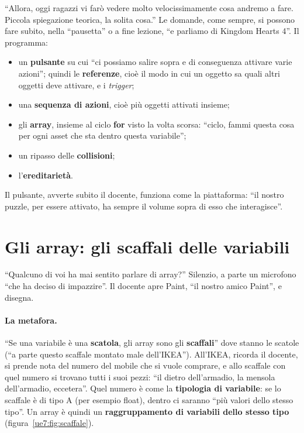 ``Allora, oggi ragazzi vi farò vedere molto velocissimamente cosa andremo a fare.
Piccola spiegazione teorica, la solita cosa.'' Le domande, come sempre, si possono fare
subito, nella ``pausetta'' o a fine lezione, ``e parliamo di Kingdom Hearts 4''. Il
programma:
\begin{itemize}
  \item un \textbf{pulsante} su cui ``ci possiamo salire sopra e di conseguenza
        attivare varie azioni''; quindi le \textbf{referenze}, cioè il modo in cui un
        oggetto sa quali altri oggetti deve attivare, e i \emph{trigger};
  \item una \textbf{sequenza di azioni}, cioè più oggetti attivati insieme;
  \item gli \textbf{array}, insieme al ciclo \textbf{for} visto la volta scorsa:
        ``ciclo, fammi questa cosa per ogni asset che sta dentro questa variabile'';
  \item un ripasso delle \textbf{collisioni};
  \item l'\textbf{ereditarietà}.
\end{itemize}
Il pulsante, avverte subito il docente, funziona come la piattaforma: ``il nostro
puzzle, per essere attivato, ha sempre il volume sopra di esso che interagisce''.

\section{Gli array: gli scaffali delle variabili}
\label{ue7:sec:arrayteoria}

``Qualcuno di voi ha mai sentito parlare di array?'' Silenzio, a parte un microfono
``che ha deciso di impazzire''. Il docente apre Paint, ``il nostro amico Paint'', e
disegna.

\paragraph{La metafora.} ``Se una variabile è una \textbf{scatola}, gli array sono gli
\textbf{scaffali}'' dove stanno le scatole (``a parte questo scaffale montato male
dell'IKEA''). All'IKEA, ricorda il docente, si prende nota del numero del mobile che si
vuole comprare, e allo scaffale con quel numero si trovano tutti i suoi pezzi: ``il
dietro dell'armadio, la mensola dell'armadio, eccetera''. Quel numero è come la
\textbf{tipologia di variabile}: se lo scaffale è di tipo A (per esempio float), dentro
ci saranno ``più valori dello stesso tipo''. Un array è quindi un \textbf{raggruppamento
di variabili dello stesso tipo} (figura~\ref{ue7:fig:scaffale}).

